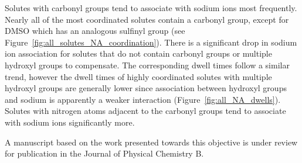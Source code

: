\documentclass{article}
\begin{document}
  Solutes with carbonyl groups tend to associate with sodium ions most frequently.
  Nearly all of the most coordinated solutes contain a carbonyl group, except
  for DMSO which has an analogous sulfinyl group (see Figure~\ref{fig:all_solutes_NA_coordination}). There is a significant drop
  in sodium ion association for solutes that do not contain carbonyl groups or
  multiple hydroxyl groups to compensate.
  The corresponding dwell times follow a similar trend, however the dwell
  times of highly coordinated solutes with multiple hydroxyl groups are generally
  lower since association between hydroxyl groups and sodium is apparently a 
  weaker interaction (Figure~\ref{fig:all_NA_dwells}). Solutes with nitrogen 
  atoms adjacent to the carbonyl groups tend to associate with sodium ions 
  significantly more.

  A manuscript based on the work presented towards this objective is under 
  review for publication in the Journal of Physical Chemistry B.
  
\end{document}
